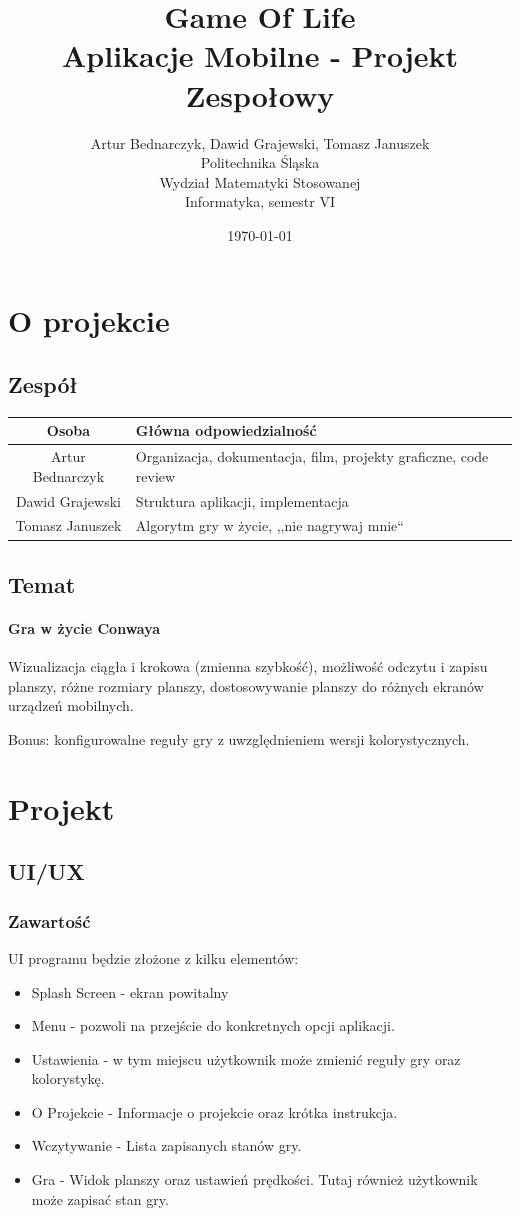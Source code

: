 \documentclass[12pt,a4paper]{article}
\title{Game Of Life\\Aplikacje Mobilne - Projekt Zespołowy}
\author{Artur Bednarczyk, Dawid Grajewski, Tomasz Januszek\\Politechnika Śląska\\Wydział Matematyki Stosowanej\\Informatyka, semestr VI}
\date{\today}
\begin{document}
\maketitle
\newpage
\tableofcontents
\newpage
\section{O projekcie}
\subsection{Zespół}
\begin{tabular}{c|l}
Osoba & Główna odpowiedzialność \\
\hline
Artur Bednarczyk & Organizacja, dokumentacja, film, projekty graficzne, code review \\
Dawid Grajewski & Struktura aplikacji, implementacja\\
Tomasz Januszek & Algorytm gry w życie, ,,nie nagrywaj mnie``
\end{tabular}
\subsection{Temat}
\paragraph{Gra w życie Conwaya}
Wizualizacja ciągła i krokowa (zmienna szybkość), możliwość odczytu i zapisu planszy, różne rozmiary planszy, dostosowywanie planszy do różnych ekranów urządzeń mobilnych.
	
	Bonus: konfigurowalne reguły gry z uwzględnieniem wersji kolorystycznych.

\section{Projekt}
\subsection{UI/UX}
\subsubsection{Zawartość}
UI programu będzie złożone z kilku elementów:
\begin{itemize}
	\item Splash Screen - ekran powitalny
	\item Menu - pozwoli na przejście do konkretnych opcji aplikacji.
	\item Ustawienia - w tym miejscu użytkownik może zmienić reguły gry oraz kolorystykę.
	\item O Projekcie - Informacje o projekcie oraz krótka instrukcja.
	\item Wczytywanie - Lista zapisanych stanów gry.
	\item Gra - Widok planszy oraz ustawień prędkości. Tutaj również użytkownik może zapisać stan gry.
\end{itemize}
\end{document}
